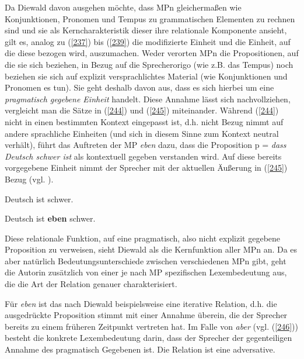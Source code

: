 Da Diewald davon ausgehen möchte, dass MPn gleichermaßen wie Konjunktionen, Pronomen und Tempus zu grammatischen Elementen zu rechnen sind und sie als Kerncharakteristik dieser ihre relationale Komponente ansieht, gilt es, analog zu (\ref{237}) bis (\ref{239}) die modifizierte Einheit und die Einheit, auf die diese bezogen wird, auszumachen. Weder verorten MPn die Propositionen, auf die sie sich beziehen, in Bezug auf die Sprecherorigo (wie z.B. das Tempus) noch beziehen sie sich auf explizit versprachlichtes Material (wie Konjunktionen und Pronomen es tun). Sie geht deshalb davon aus, dass es sich hierbei um eine \textit{pragmatisch gegebene Einheit} handelt. Diese Annahme lässt sich nachvollziehen, vergleicht man die Sätze in (\ref{244}) und (\ref{245}) miteinander. Während (\ref{244}) nicht in einen bestimmten Kontext eingepasst ist, d.h. nicht Bezug nimmt auf andere sprachliche Einheiten (und sich in diesem Sinne zum Kontext neutral verhält), führt das Auftreten der MP \textit{eben} dazu, dass die Proposition p = \textit{dass Deutsch schwer ist} als kontextuell gegeben verstanden wird. Auf diese bereits vorgegebene Einheit nimmt der Sprecher mit der aktuellen Äußerung in (\ref{245}) Bezug (vgl. \citealt[416]{Diewald2006}).

\begin{exe}
	\ex\label{244} 
	Deutsch ist schwer.
\end{exe}
\vspace{-0.65cm}
\begin{exe}
	\ex\label{245} 
	Deutsch ist \textbf{eben} schwer.
\end{exe}
Diese relationale Funktion, auf eine pragmatisch, also nicht explizit gegebene Proposition zu verweisen, sieht Diewald als die Kernfunktion aller MPn an. Da es aber natürlich Bedeutungsunterschiede zwischen verschiedenen MPn gibt, geht die Autorin zusätzlich von einer je nach MP spezifischen Lexembedeutung aus, die die Art der Relation genauer charakterisiert. 
	
Für \textit{eben} ist das nach Diewald beispielsweise eine iterative Relation, d.h. die ausgedrückte Proposition stimmt mit einer Annahme überein, die der Sprecher bereits zu einem früheren Zeitpunkt vertreten hat. Im Falle von \textit{aber} (vgl. (\ref{246})) besteht die konkrete Lexembedeutung darin, dass der Sprecher der gegenteiligen Annahme des pragmatisch Gegebenen ist. Die Relation ist eine adversative.

